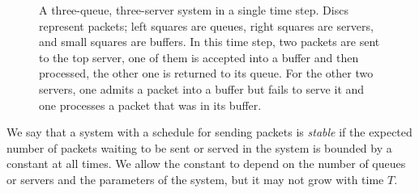 \begin{figure}[t!]
{
}%
\caption{A three-queue, three-server system in a single time step. Discs represent packets; left squares are queues, right squares are servers, and small squares are buffers. In this time step, two packets are sent to the top server, one of them is accepted into a buffer and then processed, the other one is returned to its queue. For the other two servers, one admits a packet into a buffer but fails to serve it and one processes a packet that was in its buffer.}
\label{fig:model}
\end{figure}

\begin{definition}
    We say that a system with a schedule for sending packets is \emph{stable} if the expected number of packets waiting to be sent or served in the system is bounded by a constant at all times. We allow the constant to depend on the number of queues or servers and the parameters of the system, but it may not grow with time $T$. 
\end{definition}

